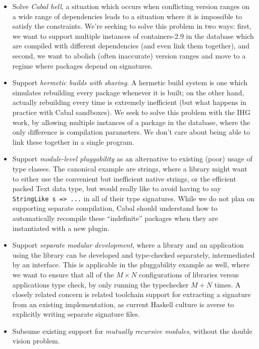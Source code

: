 \documentclass{article}
\begin{document}
\begin{itemize}
    \item Solve \emph{Cabal hell}, a situation which occurs when conflicting
        version ranges on a wide range of dependencies leads to a situation
        where it is impossible to satisfy the constraints.  We're seeking
        to solve this problem in two ways: first, we want to support
        multiple instances of containers-2.9 in the database which are
        compiled with different dependencies (and even link them
        together), and second, we want to abolish (often inaccurate)
        version ranges and move to a regime where packages depend on
        signatures.

    \item Support \emph{hermetic builds with sharing}.  A hermetic build
        system is one which simulates rebuilding every package whenever
        it is built; on the other hand, actually rebuilding every time
        is extremely inefficient (but what happens in practice with
        Cabal sandboxes).  We seek to solve this problem with the IHG work,
        by allowing multiple instances of a package in the database, where
        the only difference is compilation parameters.  We don't care
        about being able to link these together in a single program.

    \item Support \emph{module-level pluggability} as an alternative to
        existing (poor) usage of type classes.  The canonical example are
        strings, where a library might want to either use the convenient
        but inefficient native strings, or the efficient packed Text data
        type, but would really like to avoid having to say \verb|StringLike s => ...|
        in all of their type signatures.  While we do not plan on supporting
        separate compilation, Cabal should understand how to automatically
        recompile these ``indefinite'' packages when they are instantiated
        with a new plugin.

    \item Support \emph{separate modular development}, where a library and
        an application using the library can be developed and type-checked
        separately, intermediated by an interface.  This is applicable in
        the pluggability example as well, where we want to ensure that all
        of the $M \times N$ configurations of libraries versus applications
        type check, by only running the typechecker $M + N$ times.  A closely
        related concern is related toolchain support for extracting a signature
        from an existing implementation, as current Haskell culture is averse
        to explicitly writing separate signature files.

    \item Subsume existing support for \emph{mutually recursive modules},
        without the double vision problem.
\end{itemize}
\end{document}
